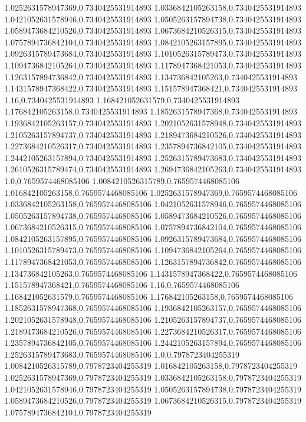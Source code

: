 1.0252631578947369,0.7340425531914893
1.0336842105263158,0.7340425531914893
1.0421052631578946,0.7340425531914893
1.0505263157894738,0.7340425531914893
1.0589473684210526,0.7340425531914893
1.0673684210526315,0.7340425531914893
1.0757894736842104,0.7340425531914893
1.0842105263157895,0.7340425531914893
1.0926315789473684,0.7340425531914893
1.1010526315789473,0.7340425531914893
1.1094736842105264,0.7340425531914893
1.1178947368421053,0.7340425531914893
1.1263157894736842,0.7340425531914893
1.134736842105263,0.7340425531914893
1.1431578947368422,0.7340425531914893
1.151578947368421,0.7340425531914893
1.16,0.7340425531914893
1.168421052631579,0.7340425531914893
1.176842105263158,0.7340425531914893
1.1852631578947368,0.7340425531914893
1.1936842105263157,0.7340425531914893
1.2021052631578948,0.7340425531914893
1.2105263157894737,0.7340425531914893
1.2189473684210526,0.7340425531914893
1.2273684210526317,0.7340425531914893
1.2357894736842105,0.7340425531914893
1.2442105263157894,0.7340425531914893
1.2526315789473683,0.7340425531914893
1.2610526315789474,0.7340425531914893
1.2694736842105263,0.7340425531914893
1.0,0.7659574468085106
1.0084210526315789,0.7659574468085106
1.016842105263158,0.7659574468085106
1.0252631578947369,0.7659574468085106
1.0336842105263158,0.7659574468085106
1.0421052631578946,0.7659574468085106
1.0505263157894738,0.7659574468085106
1.0589473684210526,0.7659574468085106
1.0673684210526315,0.7659574468085106
1.0757894736842104,0.7659574468085106
1.0842105263157895,0.7659574468085106
1.0926315789473684,0.7659574468085106
1.1010526315789473,0.7659574468085106
1.1094736842105264,0.7659574468085106
1.1178947368421053,0.7659574468085106
1.1263157894736842,0.7659574468085106
1.134736842105263,0.7659574468085106
1.1431578947368422,0.7659574468085106
1.151578947368421,0.7659574468085106
1.16,0.7659574468085106
1.168421052631579,0.7659574468085106
1.176842105263158,0.7659574468085106
1.1852631578947368,0.7659574468085106
1.1936842105263157,0.7659574468085106
1.2021052631578948,0.7659574468085106
1.2105263157894737,0.7659574468085106
1.2189473684210526,0.7659574468085106
1.2273684210526317,0.7659574468085106
1.2357894736842105,0.7659574468085106
1.2442105263157894,0.7659574468085106
1.2526315789473683,0.7659574468085106
1.0,0.7978723404255319
1.0084210526315789,0.7978723404255319
1.016842105263158,0.7978723404255319
1.0252631578947369,0.7978723404255319
1.0336842105263158,0.7978723404255319
1.0421052631578946,0.7978723404255319
1.0505263157894738,0.7978723404255319
1.0589473684210526,0.7978723404255319
1.0673684210526315,0.7978723404255319
1.0757894736842104,0.7978723404255319
